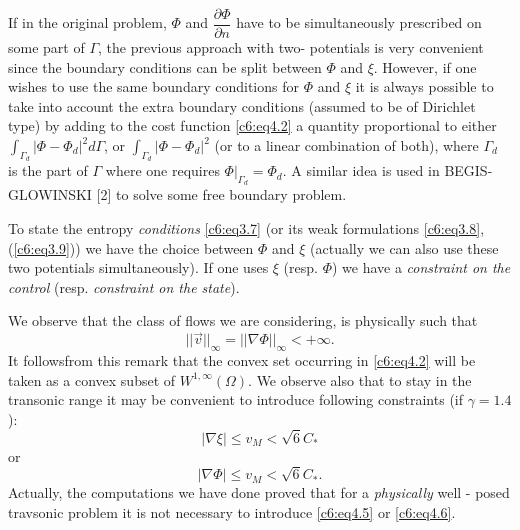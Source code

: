 \begin{remark}\label{c6:rem4.1}%
If in the original problem, $\Phi$ and $\dfrac{\partial \Phi}{\partial 
n}$ have to be simultaneously prescribed on some part of $\Gamma$, the 
previous approach with two- potentials is very convenient since the 
boundary conditions can be split between $\Phi$ and $\xi$. However, if 
one wishes to use the same boundary conditions for $\Phi$ and $\xi$ it 
is always possible to take into account the extra boundary conditions 
(assumed to be of Dirichlet type) by adding to the cost function 
\eqref{c6:eq4.2} a quantity proportional to either 
$\int_{\Gamma_d}|\Phi - \Phi_d|^2 d \Gamma$, or $\int_{\Gamma_d}| 
\Phi- \Phi_d |^2$ (or to a linear combination of both), where 
$\Gamma_d$ is the part of $\Gamma$ where one requires $\Phi 
|_{\Gamma_d} = \Phi_d$. A similar idea is used in BEGIS-GLOWINSKI [2] 
to solve some free boundary problem.            
\end{remark}

\begin{remark}\label{c6:rem4.2}%
To state the entropy {\em conditions} \eqref{c6:eq3.7} (or its weak 
formulations \eqref{c6:eq3.8}, (\ref{c6:eq3.9})) we have the choice 
between $\Phi$ and $\xi$ (actually we can also use these two potentials 
simultaneously). If one uses $\xi$ (resp. $\Phi $) we have a {\em 
constraint on the control} (resp. {\em constraint on the state}).     
\end{remark}

\begin{remark}\label{c6:rem4.3}%
We observe that the class of flows we are considering, is physically 
such that  
$$
|| \vec{v} ||_\infty = || \nabla \Phi ||_\infty < + \infty.
$$
It follows\pageoriginale  from this remark that the convex set occurring in 
\eqref{c6:eq4.2} will be taken as a convex subset of $W^{1, \infty} 
(\Omega )$. We observe also that to stay in the transonic range it may 
be convenient to introduce following constraints (if $\gamma = 1. 4$):  
\begin{equation}
|\nabla \xi | \leq v_M < \sqrt{6} C_* \tag{4.5}\label{c6:eq4.5}
\end{equation}
or 
\begin{equation}
|\nabla \Phi | \leq v_M < \sqrt{6} C_*. \tag{4.6}\label{c6:eq4.6}
\end{equation}
Actually, the computations we have done proved that for a 
\textit{physically} well - posed travsonic problem it is not necessary 
to introduce \eqref{c6:eq4.5} or \eqref{c6:eq4.6}.  
\end{remark}

